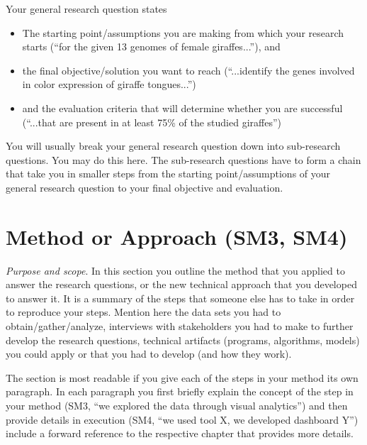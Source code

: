 \documentclass[
  fontsize=10pt,
  numbers=noenddot,
  english,  %
  paper=a5,
  twoside,  %
  DIV=calc,
  headings=small,
  bibliography=totoc,
  listof=totoc,
  draft=false
]{scrbook}
\theoremstyle{break}
\begin{document}
Your general research question states
\begin{itemize}
  \item The starting point/assumptions you are making from which your research starts (``for the given 13 genomes of female giraffes...''), and
  \item the final objective/solution you want to reach (``...identify the genes involved in color expression of giraffe tongues...'')
  \item and the evaluation criteria that will determine whether you are successful (``...that are present in at least 75\% of the studied giraffes'')
\end{itemize}

You will usually break your general research question down into sub-research questions.
You may do this here.
The sub-research questions have to form a chain that take you in smaller steps from the starting point/assumptions of your general research question to your final objective and evaluation.

\section{Method or Approach (SM3, SM4)}\label{sec:introduction:method}

\emph{Purpose and scope}.
In this section you outline the method that you applied to answer the research questions, or the new technical approach that you developed to answer it.
It is a summary of the steps that someone else has to take in order to reproduce your steps.
Mention here the data sets you had to obtain/gather/analyze, interviews with stakeholders you had to make to further develop the research questions, technical artifacts (programs, algorithms, models) you could apply or that you had to develop (and how they work).

The section is most readable if you give each of the steps in your method its own paragraph.
In each paragraph you first briefly explain the concept of the step in your method (SM3, ``we explored the data through visual analytics'') and then provide details in execution (SM4, ``we used tool X, we developed dashboard Y'') include a forward reference to the respective chapter that provides more details.

\end{document}
